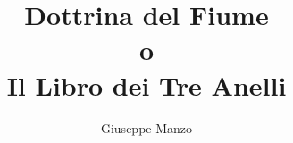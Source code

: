 \documentclass[a5paper]{book}
\begin{document}
\title{
	Dottrina del Fiume\\
	\large o\\
	Il Libro dei Tre Anelli
}
\author{Giuseppe Manzo}

\frontmatter
\maketitle
\tableofcontents



\mainmatter





\backmatter
\end{document}
